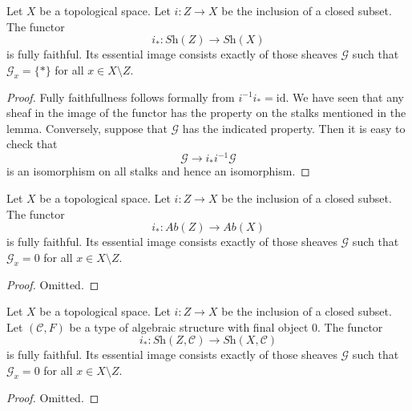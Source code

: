 \begin{lemma}
\label{lemma-equivalence-categories-closed}
Let $X$ be a topological space.
Let $i : Z \to X$ be the inclusion of a closed subset.
The functor
$$
i_* : \textit{Sh}(Z) \longrightarrow \textit{Sh}(X)
$$
is fully faithful. Its essential image consists exactly
of those sheaves $\mathcal{G}$ such that
$\mathcal{G}_x = \{*\}$ for all $x \in X \setminus Z$.
\end{lemma}

\begin{proof}
Fully faithfullness follows formally from $i^{-1} i_* = \text{id}$.
We have seen that any sheaf in the image of the functor has
the property on the stalks mentioned in the lemma. Conversely, suppose
that $\mathcal{G}$ has the indicated property.
Then it is easy to check that
$$
\mathcal{G} \to i_* i^{-1} \mathcal{G}
$$
is an isomorphism on all stalks and hence an isomorphism.
\end{proof}

\begin{lemma}
\label{lemma-equivalence-categories-closed-abelian}
Let $X$ be a topological space.
Let $i : Z \to X$ be the inclusion of a closed subset.
The functor
$$
i_* : \textit{Ab}(Z) \longrightarrow \textit{Ab}(X)
$$
is fully faithful. Its essential image consists exactly
of those sheaves $\mathcal{G}$ such that
$\mathcal{G}_x = 0$ for all $x \in X \setminus Z$.
\end{lemma}

\begin{proof}
Omitted.
\end{proof}

\begin{lemma}
\label{lemma-equivalence-categories-closed-structures}
Let $X$ be a topological space.
Let $i : Z \to X$ be the inclusion of a closed subset.
Let $(\mathcal{C}, F)$ be a type of algebraic structure
with final object $0$. The functor
$$
i_* : \textit{Sh}(Z, \mathcal{C}) \longrightarrow \textit{Sh}(X, \mathcal{C})
$$
is fully faithful. Its essential image consists exactly
of those sheaves $\mathcal{G}$ such that
$\mathcal{G}_x = 0$ for all $x \in X \setminus Z$.
\end{lemma}

\begin{proof}
Omitted.
\end{proof}


